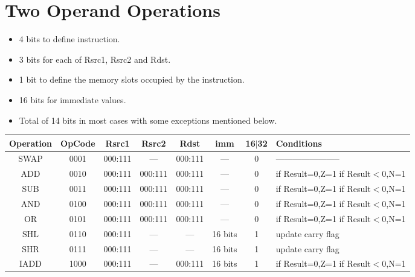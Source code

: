 \documentclass[12pt]{report}
\begin{document}
\section{Two Operand Operations}
\begin{itemize}
    \item 4 bits to define instruction.
    \item 3 bits for each of Rsrc1, Rsrc2 and Rdst.
    \item 1 bit to define the memory slots occupied by the instruction.
    \item 16 bits for immediate values.
    \item Total of 14 bits in most cases with some exceptions mentioned below.
\end{itemize}
\begin{center}
 \begin{tabular}{||c| c| c| c| c| c| c| p{30mm}||} 
 \hline
 Operation & OpCode & Rsrc1 & Rsrc2 & Rdst & imm & 16$|$32 & Conditions  \\ [0.5ex] 
 \hline\hline
 SWAP & 0001 & 000:111 & --- & 000:111 & --- & 0 & ----------------------- \\
 \hline
 ADD & 0010 & 000:111 & 000:111 & 000:111 & --- & 0 & if Result=0,Z=1 \newline if Result$<$0,N=1 \\
 \hline
 SUB & 0011 & 000:111 & 000:111 & 000:111 & --- & 0 & if Result=0,Z=1 \newline if Result$<$0,N=1 \\
 \hline
 AND & 0100 & 000:111 & 000:111 & 000:111 & --- & 0 & if Result=0,Z=1 \newline if Result$<$0,N=1 \\
 \hline
 OR & 0101 & 000:111 & 000:111 & 000:111 & --- & 0 & if Result=0,Z=1 \newline if Result$<$0,N=1 \\
 \hline
 SHL & 0110 & 000:111 & --- & --- & 16 bits & 1 & update carry flag \\
 \hline
 SHR & 0111 & 000:111 & --- & --- & 16 bits & 1 & update carry flag \\
 \hline
 IADD & 1000 & 000:111 & --- & 000:111 & 16 bits & 1 & if Result=0,Z=1 \newline if Result$<$0,N=1 \\
 \hline
\end{tabular}
\end{center}
\end{document}

